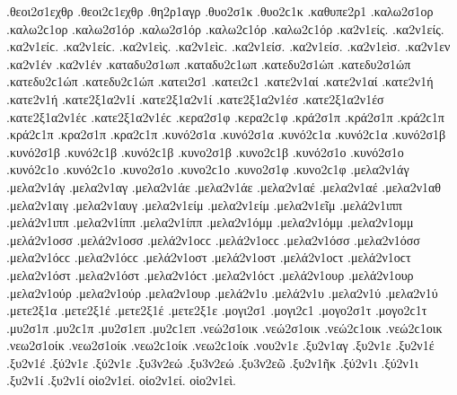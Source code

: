 {.θεοι2σ1εχθρ .θεοι2ϲ1εχθρ   %
.θη2ρ1αγρ   %
.θυο2σ1κ .θυο2ϲ1κ   %
.καθυπε2ρ1   %
.καλω2σ1ορ .καλω2ϲ1ορ   %
.καλω2σ1όρ .καλω2σ1όρ .καλω2ϲ1όρ .καλω2ϲ1όρ 
.κα2ν1είς. .κα2ν1είς. .κα2ν1είϲ. .κα2ν1είϲ.   %
.κα2ν1εὶς. .κα2ν1εὶϲ. 
.κα2ν1είσ. .κα2ν1είσ. 
.κα2ν1εὶσ. 
.κα2ν1εν 
.κα2ν1έν .κα2ν1έν 
.καταδυ2σ1ωπ .καταδυ2ϲ1ωπ   %
.κατεδυ2σ1ώπ .κατεδυ2σ1ώπ .κατεδυ2ϲ1ώπ .κατεδυ2ϲ1ώπ   %
.κατει2σ1 .κατει2ϲ1   %
.κατε2ν1αί .κατε2ν1αί   %
.κατε2ν1ή .κατε2ν1ή   %
.κατε2ξ1α2ν1ί .κατε2ξ1α2ν1ί   %
.κατε2ξ1α2ν1έσ .κατε2ξ1α2ν1έσ .κατε2ξ1α2ν1έϲ .κατε2ξ1α2ν1έϲ   %
.κερα2σ1φ .κερα2ϲ1φ   %
.κρά2σ1π .κρά2σ1π .κρά2ϲ1π .κρά2ϲ1π   %
.κρα2σ1π .κρα2ϲ1π 
.κυνό2σ1α .κυνό2σ1α .κυνό2ϲ1α .κυνό2ϲ1α   %
.κυνό2σ1β .κυνό2σ1β .κυνό2ϲ1β .κυνό2ϲ1β   %
.κυνο2σ1β .κυνο2ϲ1β 
.κυνό2σ1ο .κυνό2σ1ο .κυνό2ϲ1ο .κυνό2ϲ1ο   %
.κυνο2σ1ο .κυνο2ϲ1ο 
.κυνο2σ1φ .κυνο2ϲ1φ   %
.μελα2ν1άγ .μελα2ν1άγ   %
.μελα2ν1αγ 
.μελα2ν1άε .μελα2ν1άε   %
.μελα2ν1αέ .μελα2ν1αέ 
.μελα2ν1αθ   %
.μελα2ν1αιγ   %
.μελα2ν1αυγ   %
.μελα2ν1είμ .μελα2ν1είμ   %
.μελα2ν1εῖμ   %
.μελά2ν1ιππ .μελά2ν1ιππ   %
.μελα2ν1ίππ .μελα2ν1ίππ 
.μελα2ν1όμμ .μελα2ν1όμμ   %
.μελα2ν1ομμ 
.μελά2ν1οσσ .μελά2ν1οσσ .μελά2ν1οϲϲ .μελά2ν1οϲϲ   %
.μελα2ν1όσσ .μελα2ν1όσσ .μελα2ν1όϲϲ .μελα2ν1όϲϲ 
.μελά2ν1οστ .μελά2ν1οστ .μελά2ν1οϲτ .μελά2ν1οϲτ   %
.μελα2ν1όστ .μελα2ν1όστ .μελα2ν1όϲτ .μελα2ν1όϲτ 
.μελά2ν1ουρ .μελά2ν1ουρ   %
.μελα2ν1ούρ .μελα2ν1ούρ 
.μελα2ν1ουρ   %
.μελά2ν1υ .μελά2ν1υ   %
.μελα2ν1ύ .μελα2ν1ύ 
.μετε2ξ1α   %
.μετε2ξ1έ .μετε2ξ1έ   %
.μετε2ξ1ε 
.μογι2σ1 .μογι2ϲ1   %
.μογο2σ1τ .μογο2ϲ1τ   %
.μυ2σ1π .μυ2ϲ1π   %
.μυ2σ1επ .μυ2ϲ1επ   %
.νεώ2σ1οικ .νεώ2σ1οικ .νεώ2ϲ1οικ .νεώ2ϲ1οικ   %
.νεω2σ1οίκ .νεω2σ1οίκ .νεω2ϲ1οίκ .νεω2ϲ1οίκ 
.νου2ν1ε   %
.ξυ2ν1αγ   %
.ξυ2ν1ε 
.ξυ2ν1έ .ξυ2ν1έ 
.ξύ2ν1ε .ξύ2ν1ε 
.ξυ3ν2εώ .ξυ3ν2εώ   %
.ξυ3ν2εῶ 
.ξυ2ν1ῆκ   %
.ξύ2ν1ι .ξύ2ν1ι   %
.ξυ2ν1ί .ξυ2ν1ί   %
οἱο2ν1εί. οἱο2ν1εί.   %
οἱο2ν1εὶ. 
}

